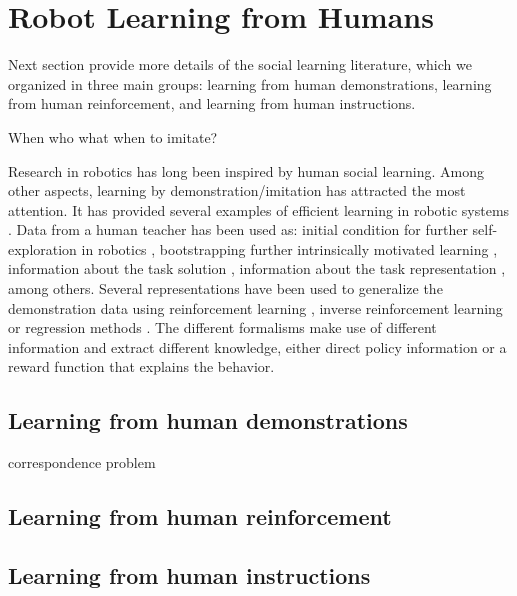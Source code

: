 \section{Robot Learning from Humans}
\label{sec:intro:social}

Next section provide more details of the social learning literature, which we organized in three main groups: learning from human demonstrations, learning from human reinforcement, and learning from human instructions. 

When who what when to imitate?

Research in robotics has long been inspired by human social learning. Among other aspects, learning by demonstration/imitation has attracted the most attention. It has provided several examples of efficient learning in robotic systems \cite{argall09survey,lopes10imitationchapter}. Data from a human teacher has been used as: initial condition for further self-exploration in robotics \cite{nicolescu2003natural}, bootstrapping further intrinsically motivated learning \cite{nguyen2011bootstrapping}, information about the task solution \cite{calinon07}, information about the task representation \cite{macl07affimit}, among others. Several representations have been used to generalize the demonstration data using reinforcement learning \cite{thomaz2008teachable}, inverse reinforcement learning \cite{macl07affimit,Abbeel04icml} or regression methods \cite{calinon07,chernova09jair}. The different formalisms make use of different information and extract different knowledge, either direct policy information or a reward function that explains the behavior.

\subsection{Learning from human demonstrations}

correspondence problem 

\subsection{Learning from human reinforcement}

\subsection{Learning from human instructions}

